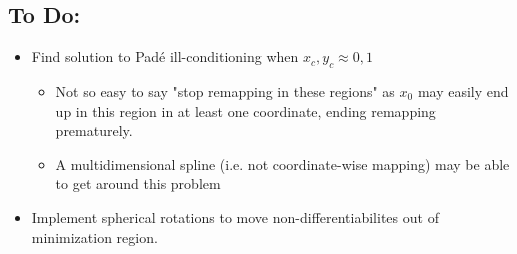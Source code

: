 \documentclass[10pt]{article}
\begin{document}
\subsection{To Do:}

\begin{itemize}
	
	\item Find solution to Pad\'{e} ill-conditioning when $x_c, y_c \approx 0,1$
	\begin{itemize}
		\item Not so easy to say "stop remapping in these regions" as $x_0$ may easily end up in this region in at least one coordinate, ending remapping prematurely.
		
		\item A multidimensional spline (i.e. not coordinate-wise mapping) may be able to get around this problem
	\end{itemize}
	
	
	\item Implement spherical rotations to move non-differentiabilites out of minimization region.
	
\end{itemize}
\end{document}
